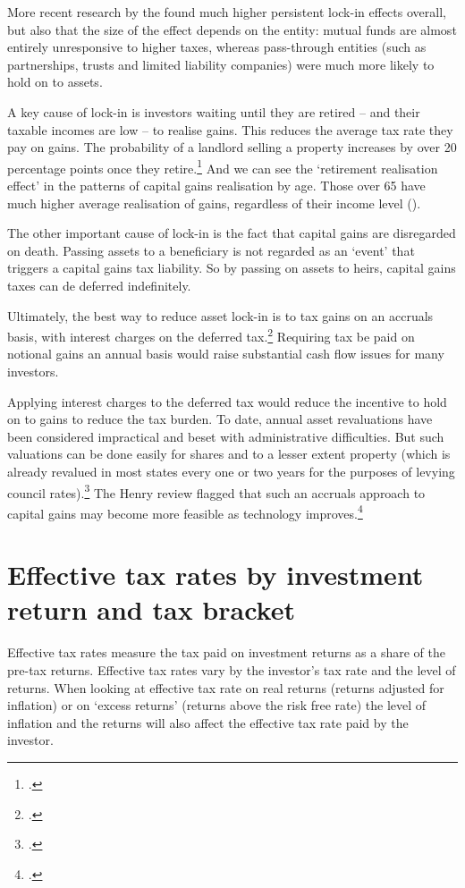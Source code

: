 \documentclass{grattanAlpha}\usepackage[]{graphicx}\usepackage[]{color}
\begin{document}
More recent research by the \textcite{CBO2012CapitalGainsTaxElasticity} found much higher persistent lock-in effects overall, but also that the size of the effect depends on the entity: mutual funds are almost entirely unresponsive to higher taxes, whereas pass-through entities (such as partnerships, trusts and limited liability companies) were much more likely to hold on to assets.

A key cause of lock-in is investors waiting until they are retired – and their taxable incomes are low – to realise gains. This reduces the average tax rate they pay on gains. The probability of a landlord selling a property increases by over 20 percentage points once they retire.\footcite{WoodOng2010}  And we can see the ‘retirement realisation effect’ in the patterns of capital gains realisation by age. Those over 65 have much higher average realisation of gains, regardless of their income level (). 

The other important cause of lock-in is the fact that capital gains are disregarded on death. Passing assets to a beneficiary is not regarded as an ‘event’ that triggers a capital gains tax liability. So by passing on assets to heirs, capital gains taxes can de deferred indefinitely. 

Ultimately, the best way to reduce asset lock-in is to tax gains on an accruals basis, with interest charges on the deferred tax.\footcites[][11--14]{Burman2009}[][12]{Ingles2009a}  Requiring tax be paid on notional gains an annual basis would raise substantial cash flow issues for many investors. 

Applying interest charges to the deferred tax would reduce the incentive to hold on to gains to reduce the tax burden. To date, annual asset revaluations have been considered impractical and beset with administrative difficulties.  But such valuations can be done easily for shares and to a lesser extent property (which is already revalued in most states every one or two years for the purposes of levying council rates).\footcite[][16--17]{DaleyCoates2015PropertyTaxes}  The Henry review flagged that such an accruals approach to capital gains may become more feasible as technology improves.\footcite[][64]{HenryTaxReview2010} 



\chapter{Effective tax rates by investment return and tax bracket}\label{appendix:EMTRs}
Effective tax rates measure the tax paid on investment returns as a share of the pre-tax returns. Effective tax rates vary by the investor’s tax rate and the level of returns. When looking at effective tax rate on real returns (returns adjusted for inflation) or on `excess returns' (returns above the risk free rate) the level of inflation and the returns will also affect the effective tax rate paid by the investor. 
\end{document}
